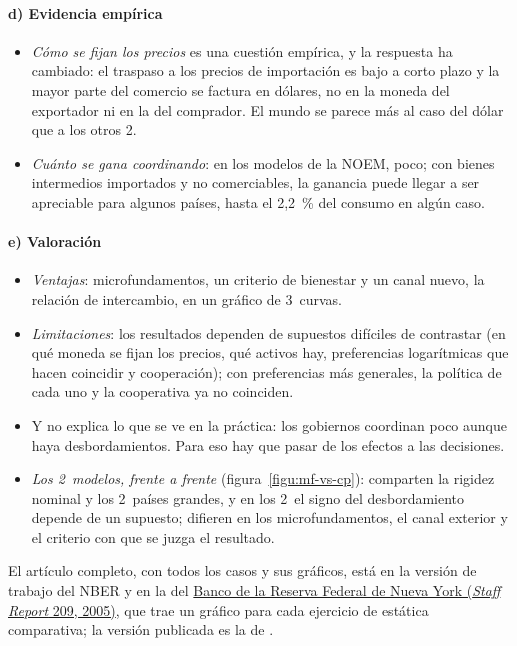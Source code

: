 \documentclass[11pt]{article}
\begin{document}
\paragraph{d) Evidencia empírica}
\begin{itemize}
\item \emph{Cómo se fijan los precios} es una cuestión empírica, y la respuesta ha cambiado: el traspaso a los precios de importación es bajo a corto plazo y la mayor parte del comercio se factura en dólares, no en la moneda del exportador ni en la del comprador\nocite{Gopinath2020DCP}. El mundo se parece más al caso del dólar que a los otros 2.
\item \emph{Cuánto se gana coordinando}: en los modelos de la NOEM, poco\nocite{ObstfeldRogoff2002Global}; con bienes intermedios importados y no comerciables, la ganancia puede llegar a ser apreciable para algunos países, hasta el 2,2~\% del consumo en algún caso\nocite{Tchakarov2004}.
\end{itemize}

\paragraph{e) Valoración}
\begin{itemize}
\item \emph{Ventajas}: microfundamentos, un criterio de bienestar y un canal nuevo, la relación de intercambio, en un gráfico de 3~curvas.
\item \emph{Limitaciones}: los resultados dependen de supuestos difíciles de contrastar (en qué moneda se fijan los precios, qué activos hay, preferencias logarítmicas que hacen coincidir  y cooperación); con preferencias más generales, la política de cada uno y la cooperativa ya no coinciden\nocite{BenignoBenigno2006}.
\item Y no explica lo que se ve en la práctica: los gobiernos coordinan poco aunque haya desbordamientos. Para eso hay que pasar de los efectos a las decisiones.
\item \emph{Los 2~modelos, frente a frente} (figura~\ref{figu:mf-vs-cp}): comparten la rigidez nominal y los 2~países grandes, y en los 2~el signo del desbordamiento depende de un supuesto; difieren en los microfundamentos, el canal exterior y el criterio con que se juzga el resultado.
\end{itemize}

\begin{anotaciones}
El artículo completo, con todos los casos y sus gráficos, está en la versión de trabajo del NBER\nocite{CorsettiPesenti2005} y en la del \href{https://www.newyorkfed.org/medialibrary/media/research/staff_reports/sr209.pdf}{Banco de la Reserva Federal de Nueva York (\emph{Staff Report} 209, 2005)}, que trae un gráfico para cada ejercicio de estática comparativa; la versión publicada es la de \textcite{CorsettiPesenti2009}.
\end{anotaciones}
\end{document}
